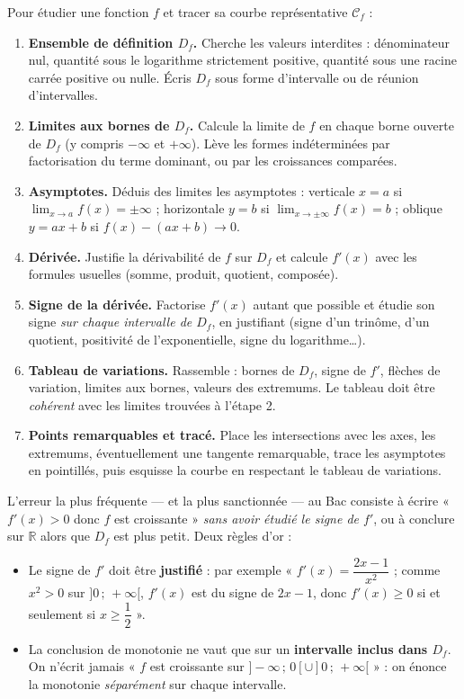\documentclass[11pt]{article}
\begin{document}
\begin{methode}
Pour étudier une fonction $f$ et tracer sa courbe représentative $\mathcal{C}_f$ :
\begin{enumerate}
\item \textbf{Ensemble de définition $D_f$.} Cherche les valeurs interdites : dénominateur nul, quantité sous le logarithme strictement positive, quantité sous une racine carrée positive ou nulle. Écris $D_f$ sous forme d'intervalle ou de réunion d'intervalles.
\item \textbf{Limites aux bornes de $D_f$.} Calcule la limite de $f$ en chaque borne ouverte de $D_f$ (y compris $-\infty$ et $+\infty$). Lève les formes indéterminées par factorisation du terme dominant, ou par les croissances comparées.
\item \textbf{Asymptotes.} Déduis des limites les asymptotes : verticale $x=a$ si $\lim_{x\to a} f(x) = \pm\infty$ ; horizontale $y=b$ si $\lim_{x\to\pm\infty} f(x) = b$ ; oblique $y=ax+b$ si $f(x)-(ax+b) \to 0$.
\item \textbf{Dérivée.} Justifie la dérivabilité de $f$ sur $D_f$ et calcule $f'(x)$ avec les formules usuelles (somme, produit, quotient, composée).
\item \textbf{Signe de la dérivée.} Factorise $f'(x)$ autant que possible et étudie son signe \emph{sur chaque intervalle de $D_f$}, en justifiant (signe d'un trinôme, d'un quotient, positivité de l'exponentielle, signe du logarithme\dots).
\item \textbf{Tableau de variations.} Rassemble : bornes de $D_f$, signe de $f'$, flèches de variation, limites aux bornes, valeurs des extremums. Le tableau doit être \emph{cohérent} avec les limites trouvées à l'étape 2.
\item \textbf{Points remarquables et tracé.} Place les intersections avec les axes, les extremums, éventuellement une tangente remarquable, trace les asymptotes en pointillés, puis esquisse la courbe en respectant le tableau de variations.
\end{enumerate}
\end{methode}

\begin{attention}
L'erreur la plus fréquente — et la plus sanctionnée — au Bac consiste à écrire « $f'(x) > 0$ donc $f$ est croissante » \emph{sans avoir étudié le signe de $f'$}, ou à conclure sur $\mathbb{R}$ alors que $D_f$ est plus petit. Deux règles d'or :
\begin{itemize}
\item Le signe de $f'$ doit être \textbf{justifié} : par exemple « $f'(x) = \dfrac{2x-1}{x^2}$ ; comme $x^2 > 0$ sur $]0\,;\,+\infty[$, $f'(x)$ est du signe de $2x-1$, donc $f'(x) \geq 0$ si et seulement si $x \geq \dfrac{1}{2}$ ».
\item La conclusion de monotonie ne vaut que sur un \textbf{intervalle inclus dans $D_f$}. On n'écrit jamais « $f$ est croissante sur $]-\infty\,;\,0[ \cup ]0\,;\,+\infty[$ » : on énonce la monotonie \emph{séparément} sur chaque intervalle.
\end{itemize}
\end{attention}
\end{document}
